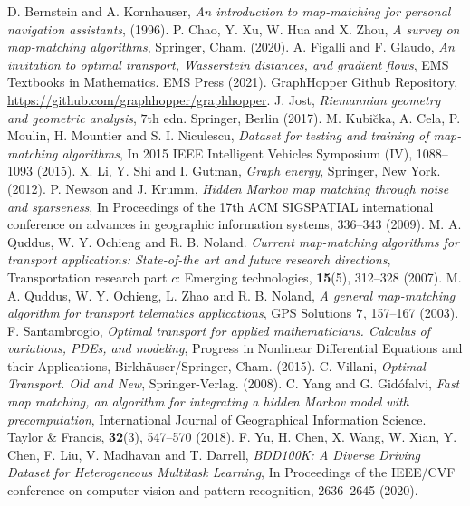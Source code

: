 \documentclass{article}
\numberwithin{equation}{section}
\theoremstyle{definition}
\begin{document}

%  
\begin{thebibliography}{YCWXCLMD}
  D. Bernstein and A. Kornhauser, \textit{An introduction to map-matching for personal navigation assistants}, (1996). 
 P. Chao,  Y. Xu,  W. Hua and X. Zhou, \textit{A survey on map-matching algorithms}, Springer, Cham. (2020).
 A. Figalli and F. Glaudo, \textit{An invitation to optimal transport, Wasserstein distances, and gradient flows}, EMS Textbooks in Mathematics. EMS Press (2021).
 GraphHopper Github Repository, \url{https://github.com/graphhopper/graphhopper}.
 J. Jost, \textit{Riemannian geometry and geometric analysis}, $7$th edn. Springer, Berlin (2017).
 M. Kubi\u cka, A. Cela, P. Moulin, H. Mountier and S. I. Niculescu, \textit{Dataset for testing and training of map-matching algorithms}, In 2015 IEEE Intelligent Vehicles Symposium (IV), 1088--1093 (2015).
 X. Li, Y. Shi and I. Gutman, \textit{Graph energy}, Springer, New York. (2012).
 P. Newson and J. Krumm, \textit{Hidden Markov map matching through noise and sparseness}, In Proceedings of the 17th ACM SIGSPATIAL international conference on advances in geographic information systems, 336--343 (2009). 
 M. A. Quddus, W. Y. Ochieng and R. B. Noland. \textit{Current map-matching algorithms for transport applications: State-of-the art and future research directions}, Transportation research part $c$: Emerging technologies, \textbf{15}(5), 312--328 (2007).
 M. A. Quddus, W. Y. Ochieng, L. Zhao and  R. B. Noland, \textit{A general map-matching algorithm for transport telematics applications}, GPS Solutions \textbf{7}, 157--167 (2003). 
 F. Santambrogio, \textit{Optimal transport for applied mathematicians. Calculus of variations, PDEs, and modeling}, Progress in Nonlinear Differential Equations and their Applications, Birkh\"{a}user/Springer, Cham. (2015).
 C. Villani, \textit{Optimal Transport. Old and New}, Springer-Verlag. (2008).
 C. Yang and G. Gid\' ofalvi, \textit{Fast map matching, an algorithm for integrating a hidden Markov model with precomputation}, International Journal of Geographical Information Science. Taylor \& Francis, \textbf{32}(3), 547--570 (2018).
 F. Yu, H. Chen, X. Wang, W. Xian, Y. Chen, F. Liu, V. Madhavan and T. Darrell, \textit{BDD100K: A Diverse Driving Dataset for Heterogeneous Multitask Learning}, In Proceedings of the IEEE/CVF conference on computer vision and pattern recognition, 2636--2645 (2020).
\end{thebibliography}
\end{document}
